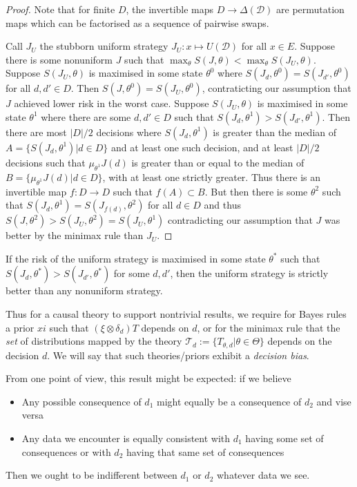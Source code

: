 \begin{proof}
Note that for finite $D$, the invertible maps $D\to \Delta(\mathcal{D})$ are permutation maps which can be factorised as a sequence of pairwise swaps.

Call $J_U$ the stubborn uniform strategy $J_U:x\mapsto U(\mathcal{D})$ for all $x\in E$. Suppose there is some nonuniform $J$ such that $\max_\theta S(J,\theta) < \max_\theta S(J_U,\theta)$. Suppose $S(J_U,\theta)$ is maximised in some state $\theta^0$ where $S(J_d,\theta^0)=S(J_{d'},\theta^0)$ for all $d,d'\in D$. Then $S(J,\theta^0)=S(J_U,\theta^0)$, contraticting our assumption that $J$ achieved lower risk in the worst case. Suppose $S(J_U,\theta)$ is maximised in some state $\theta^1$ where there are some $d,d'\in D$ such that $S(J_d,\theta^1)>S(J_{d'},\theta^1)$. Then there are most $|D|/2$ decisions where $S(J_d,\theta^1)$ is greater than the median of $A=\{S(J_d,\theta^1)|d\in D\}$ and at least one such decision, and at least $|D|/2$ decisions such that $\mu_{\theta^1} J(d)$ is greater than or equal to the median of $B=\{\mu_{\theta^1} J(d)|d\in D\}$, with at least one strictly greater. Thus there is an invertible map $f:D\to D$ such that $f(A)\subset B$. But then there is some $\theta^2$ such that $S(J_d,\theta^1)=S(J_{f(d)},\theta^2)$ for all $d\in D$ and thus $S(J,\theta^2)> S(J_U,\theta^2) = S(J_U,\theta^1)$ contradicting our assumption that $J$ was better by the minimax rule than $J_U$.
\end{proof}

\begin{corollary}
If the risk of the uniform strategy is maximised in some state $\theta^*$ such that $S(J_d,\theta^*)>S(J_{d'},\theta^*)$ for some $d,d'$, then the uniform strategy is strictly better than any nonuniform strategy.
\end{corollary}

Thus for a causal theory to support nontrivial results, we require for Bayes rules a prior $xi$ such that $(\xi\otimes \delta_d)T$ depends on $d$, or for the minimax rule that the \emph{set} of distributions mapped by the theory $\mathscr{T}_d:=\{T_{\theta,d}|\theta\in\Theta\}$ depends on the decision $d$. We will say that such theories/priors exhibit a \emph{decision bias}. 

From one point of view, this result might be expected: if we believe
\begin{itemize}
\item Any possible consequence of $d_1$ might equally be a consequence of $d_2$ and vise versa
\item Any data we encounter is equally consistent with $d_1$ having some set of consequences or with $d_2$ having that same set of consequences
\end{itemize}
Then we ought to be indifferent between $d_1$ or $d_2$ whatever data we see.

